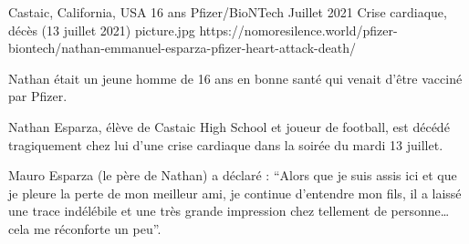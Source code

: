 {Castaic, California, USA}
{16 ans}
{Pfizer/BioNTech}
{Juillet 2021}
{Crise cardiaque, décès (13 juillet 2021)}
{picture.jpg}
{https://nomoresilence.world/pfizer-biontech/nathan-emmanuel-esparza-pfizer-heart-attack-death/}
{

Nathan était un jeune homme de 16 ans en bonne santé qui venait d'être vacciné
par Pfizer.

Nathan Esparza, élève de Castaic High School et joueur de football, est décédé
tragiquement chez lui d'une crise cardiaque dans la soirée du mardi 13 juillet.

Mauro Esparza (le père de Nathan) a déclaré : “Alors que je suis assis ici et
que je pleure la perte de mon meilleur ami, je continue d'entendre mon fils, il
a laissé une trace indélébile et une très grande impression chez tellement de
personne… cela me réconforte un peu”.

}
